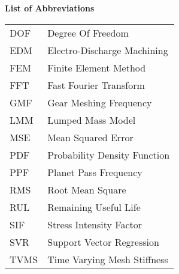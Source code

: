
{
  \thispagestyle{plain}

  {\normalfont\LARGE\bfseries\Large List of Abbreviations}

  \vspace*{1cm}
  \begin{center}
  \begin{tabular}{p{3cm}l}
    DOF      & Degree Of Freedom\\
	EDM      & Electro-Discharge Machining\\
	FEM      & Finite Element Method \\
	FFT      & Fast Fourier Transform \\
	GMF      & Gear Meshing Frequency \\
	LMM      & Lumped Mass Model\\
	MSE      & Mean Squared Error \\
	PDF      & Probability Density Function\\
	PPF      & Planet Pass Frequency\\
	RMS      & Root Mean Square\\
	RUL      & Remaining Useful Life \\
	SIF      & Stress Intensity Factor\\
	SVR      & Support Vector Regression\\
	TVMS      & Time Varying Mesh Stiffness
  \end{tabular}
  \end{center}
  \newpage
}

